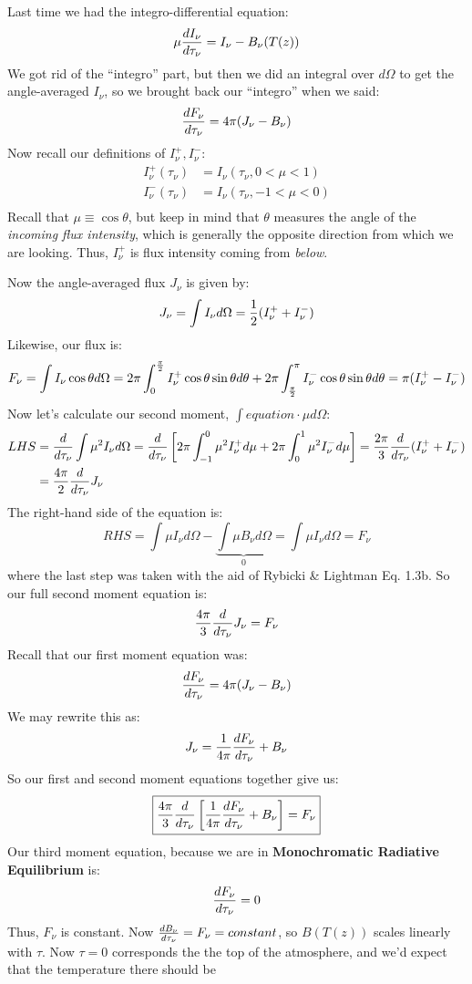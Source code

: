 \documentclass[11pt]{article}
\def\hf{{1 \over 2}}
\def\inv#1{{1 \over #1}}
\begin{document}
Last time we had the integro-differential equation:
$$\mu{dI_\nu\over d\tau_\nu}=I_\nu-B_\nu(T(z))$$
We got rid of the ``integro'' part, but then we did an integral over $d\Omega$
to get the angle-averaged $I_\nu$, so we brought back our ``integro'' when we
said:
\def\inp{{I_\nu^+}}
\def\inm{{I_\nu^-}}
$${dF_\nu\over d\tau_\nu}=4\pi(J_\nu-B_\nu)$$
Now recall our definitions of $\inp, \inm$:
$$\begin{aligned}\inp(\tau_\nu)&=I_\nu(\tau_\nu,0<\mu<1)\\ 
\inm(\tau_\nu)&=I_\nu(\tau_\nu,-1<\mu<0)\\ \end{aligned}$$
Recall that $\mu\equiv\cos\theta$, but keep in mind that $\theta$ measures the
angle of the {\it incoming flux intensity}, which is generally the opposite 
direction
from which we are looking.  Thus, $\inp$ is flux intensity coming from 
{\it below}.\par Now the angle-averaged flux $J_\nu$ is given by:
$$J_\nu=\int{I_\nu d\Omega}=\hf(\inp+\inm)$$
Likewise, our flux is:
$$F_\nu=\int{I_\nu\cos\theta d\Omega}
=2\pi\int_0^{\pi\over2}{\inp\cos\theta\sin\theta d\theta} +
2\pi\int_{\pi\over2}^{\pi}{\inm\cos\theta\sin\theta d\theta}
=\pi(\inp-\inm)$$
Now let's calculate our second moment, $\int{equation\cdot\mu d\Omega}$:
$$\begin{aligned}LHS&=\ddtau{}\int{\mu^2I_\nu d\Omega}
=\ddtau{}\left[2\pi\int_{-1}^0{\mu^2\inp d\mu}+2\pi\int_0^1{\mu^2\inm d\mu}
\right]
={2\pi\over3}\ddtau{}(\inp+\inm)\\ 
&={4\pi\over2}\ddtau{}J_\nu\\ \end{aligned}$$
The right-hand side of the equation is:
$$RHS
=\int{\mu I_\nu d\Omega}-\underbrace{\int{\mu B_\nu d\Omega}}_{0}
=\int{\mu I_\nu d\Omega}
=F_\nu$$
where the last step was taken with the aid of Rybicki \& Lightman Eq. 1.3b. 
So our full second moment equation is:
$${4\pi\over3}{d\over d\tau_\nu}J_\nu=F_\nu$$
Recall that our first moment equation was:
$${dF_\nu\over d\tau_\nu}=4\pi(J_\nu-B_\nu)$$
We may rewrite this as:
$$J_\nu=\inv{4\pi}\ddtau{F_\nu}+B_\nu$$
So our first and second moment equations together give us:
$$\boxed{{4\pi\over3}\ddtau{}
\left[\inv{4\pi}\ddtau{F_\nu}+B_\nu\right]=F_\nu}$$
Our third moment equation, because we are in {\bf Monochromatic Radiative
Equilibrium} is:
$${dF_\nu\over d\tau_\nu}=0$$
Thus, $F_\nu$ is constant.  Now ${dB_\nu\over d\tau_\nu}=F_\nu=constant$, so $B(T(z))$
scales linearly with $\tau$.  Now $\tau=0$ corresponds the the top
of the atmosphere, and we'd expect that the temperature there should be
\end{document}
